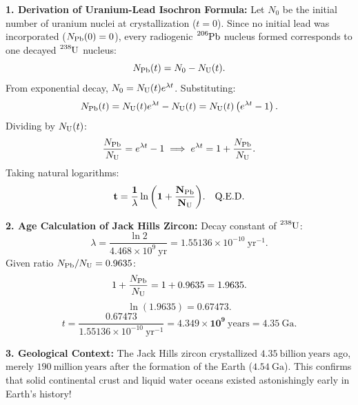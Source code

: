 \begin{solution}
\textbf{1. Derivation of Uranium-Lead Isochron Formula:}
Let $N_0$ be the initial number of uranium nuclei at crystallization ($t = 0$).
Since no initial lead was incorporated ($N_{\ce{Pb}}(0) = 0$), every radiogenic $\ce{^{206}Pb}$ nucleus formed corresponds to one decayed $\ce{^{238}U}$ nucleus:
\[
N_{\ce{Pb}}(t) = N_0 - N_{\ce{U}}(t).
\]
From exponential decay, $N_0 = N_{\ce{U}}(t) e^{\lambda t}$. Substituting:
\[
N_{\ce{Pb}}(t) = N_{\ce{U}}(t) e^{\lambda t} - N_{\ce{U}}(t) = N_{\ce{U}}(t) \left( e^{\lambda t} - 1 \right).
\]
Dividing by $N_{\ce{U}}(t)$:
\[
\frac{N_{\ce{Pb}}}{N_{\ce{U}}} = e^{\lambda t} - 1 \implies e^{\lambda t} = 1 + \frac{N_{\ce{Pb}}}{N_{\ce{U}}}.
\]
Taking natural logarithms:
\[
\mathbf{t = \frac{1}{\lambda} \ln \left( 1 + \frac{N_{\ce{Pb}}}{N_{\ce{U}}} \right)}. \quad \text{Q.E.D.}
\]

\textbf{2. Age Calculation of Jack Hills Zircon:}
Decay constant of $\ce{^{238}U}$:
\[
\lambda = \frac{\ln 2}{4.468 \times 10^9\ \mathrm{yr}} = 1.55136 \times 10^{-10}\ \mathrm{yr^{-1}}.
\]
Given ratio $N_{\ce{Pb}} / N_{\ce{U}} = 0.9635$:
\[
1 + \frac{N_{\ce{Pb}}}{N_{\ce{U}}} = 1 + 0.9635 = 1.9635.
\]
\[
\ln(1.9635) = 0.67473.
\]
\[
t = \frac{0.67473}{1.55136 \times 10^{-10}\ \mathrm{yr^{-1}}} = \mathbf{4.349 \times 10^9\ \mathrm{years}} = \mathbf{4.35\ \mathrm{Ga}}.
\]

\textbf{3. Geological Context:}
The Jack Hills zircon crystallized $\mathbf{4.35\ \mathrm{billion\ years}}$ ago, merely $190\ \mathrm{million\ years}$ after the formation of the Earth ($4.54\ \mathrm{Ga}$). This confirms that solid continental crust and liquid water oceans existed astonishingly early in Earth's history!
\end{solution}

